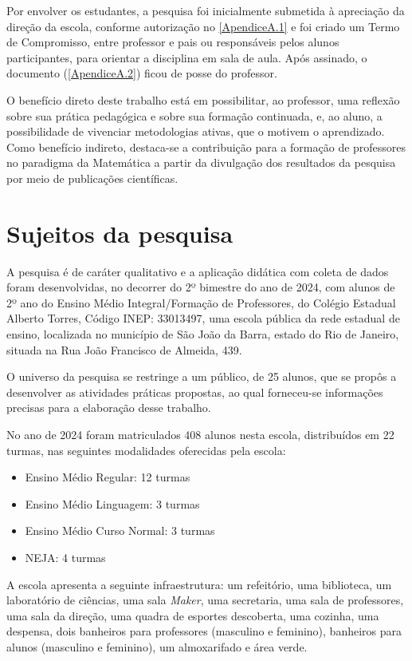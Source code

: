 Por envolver os estudantes, a pesquisa foi inicialmente submetida à apreciação da direção da escola, conforme autorização no \autoref{ApendiceA.1} e foi criado um Termo de Compromisso, entre professor e pais ou responsáveis pelos alunos participantes, para orientar a disciplina em sala de aula. Após assinado, o documento (\autoref{ApendiceA.2}) ficou de posse do professor.

O benefício direto deste trabalho está em possibilitar, ao professor, uma reflexão sobre sua prática pedagógica e sobre sua formação continuada,  e, ao aluno, a possibilidade de vivenciar metodologias ativas, que o motivem o aprendizado. Como benefício indireto, destaca-se a contribuição para a formação de professores no paradigma da Matemática a partir da divulgação dos resultados da pesquisa por meio de publicações científicas.

\section{Sujeitos da pesquisa}

A pesquisa é de caráter qualitativo e a aplicação didática com coleta de dados foram desenvolvidas, no decorrer do 2º bimestre do ano de 2024, com alunos de 2º ano do Ensino Médio Integral/Formação de Professores, do Colégio Estadual Alberto Torres, Código INEP: 33013497, uma escola pública da rede estadual de ensino, localizada no município de São João da Barra, estado do Rio de Janeiro, situada na Rua João Francisco de Almeida, 439.

O universo da pesquisa se restringe a um público, de 25 alunos, que se propôs a desenvolver as atividades práticas propostas, ao qual forneceu-se informações precisas para a elaboração desse trabalho.

No ano de 2024 foram matriculados 408 alunos nesta escola, distribuídos em 22 turmas, nas seguintes modalidades oferecidas pela escola:

\begin{itemize}
    \item Ensino Médio Regular: 12 turmas
    \item Ensino Médio Linguagem: 3 turmas
    \item Ensino Médio Curso Normal: 3 turmas
    \item NEJA: 4 turmas
\end{itemize}

A escola apresenta a seguinte infraestrutura: um refeitório, uma biblioteca, um laboratório de ciências, uma sala \textit{Maker}, uma secretaria, uma sala de  professores, uma sala da direção, uma quadra de esportes descoberta, uma cozinha, uma despensa, dois banheiros para professores (masculino e feminino), banheiros para alunos (masculino e feminino), um almoxarifado e área verde.

